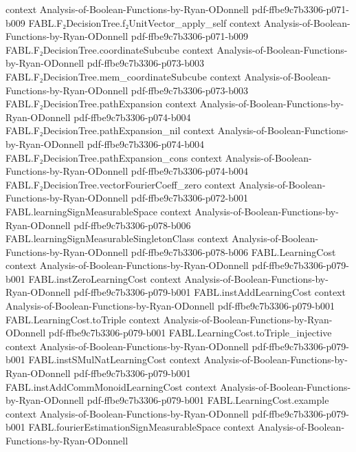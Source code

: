 \begin{theorem}
  {context}
  {Analysis-of-Boolean-Functions-by-Ryan-ODonnell}
  {pdf-ffbe9c7b3306-p071-b009}
\proofstep
  {FABL.F₂DecisionTree.f₂UnitVector_apply_self}
  {context}
  {Analysis-of-Boolean-Functions-by-Ryan-ODonnell}
  {pdf-ffbe9c7b3306-p071-b009}
\proofstep
  {FABL.F₂DecisionTree.coordinateSubcube}
  {context}
  {Analysis-of-Boolean-Functions-by-Ryan-ODonnell}
  {pdf-ffbe9c7b3306-p073-b003}
\proofstep
  {FABL.F₂DecisionTree.mem_coordinateSubcube}
  {context}
  {Analysis-of-Boolean-Functions-by-Ryan-ODonnell}
  {pdf-ffbe9c7b3306-p073-b003}
\proofstep
  {FABL.F₂DecisionTree.pathExpansion}
  {context}
  {Analysis-of-Boolean-Functions-by-Ryan-ODonnell}
  {pdf-ffbe9c7b3306-p074-b004}
\proofstep
  {FABL.F₂DecisionTree.pathExpansion_nil}
  {context}
  {Analysis-of-Boolean-Functions-by-Ryan-ODonnell}
  {pdf-ffbe9c7b3306-p074-b004}
\proofstep
  {FABL.F₂DecisionTree.pathExpansion_cons}
  {context}
  {Analysis-of-Boolean-Functions-by-Ryan-ODonnell}
  {pdf-ffbe9c7b3306-p074-b004}
\proofstep
  {FABL.F₂DecisionTree.vectorFourierCoeff_zero}
  {context}
  {Analysis-of-Boolean-Functions-by-Ryan-ODonnell}
  {pdf-ffbe9c7b3306-p072-b001}
\proofstep
  {FABL.learningSignMeasurableSpace}
  {context}
  {Analysis-of-Boolean-Functions-by-Ryan-ODonnell}
  {pdf-ffbe9c7b3306-p078-b006}
\proofstep
  {FABL.learningSignMeasurableSingletonClass}
  {context}
  {Analysis-of-Boolean-Functions-by-Ryan-ODonnell}
  {pdf-ffbe9c7b3306-p078-b006}
\proofstep
  {FABL.LearningCost}
  {context}
  {Analysis-of-Boolean-Functions-by-Ryan-ODonnell}
  {pdf-ffbe9c7b3306-p079-b001}
\proofstep
  {FABL.instZeroLearningCost}
  {context}
  {Analysis-of-Boolean-Functions-by-Ryan-ODonnell}
  {pdf-ffbe9c7b3306-p079-b001}
\proofstep
  {FABL.instAddLearningCost}
  {context}
  {Analysis-of-Boolean-Functions-by-Ryan-ODonnell}
  {pdf-ffbe9c7b3306-p079-b001}
\proofstep
  {FABL.LearningCost.toTriple}
  {context}
  {Analysis-of-Boolean-Functions-by-Ryan-ODonnell}
  {pdf-ffbe9c7b3306-p079-b001}
\proofstep
  {FABL.LearningCost.toTriple_injective}
  {context}
  {Analysis-of-Boolean-Functions-by-Ryan-ODonnell}
  {pdf-ffbe9c7b3306-p079-b001}
\proofstep
  {FABL.instSMulNatLearningCost}
  {context}
  {Analysis-of-Boolean-Functions-by-Ryan-ODonnell}
  {pdf-ffbe9c7b3306-p079-b001}
\proofstep
  {FABL.instAddCommMonoidLearningCost}
  {context}
  {Analysis-of-Boolean-Functions-by-Ryan-ODonnell}
  {pdf-ffbe9c7b3306-p079-b001}
\proofstep
  {FABL.LearningCost.example}
  {context}
  {Analysis-of-Boolean-Functions-by-Ryan-ODonnell}
  {pdf-ffbe9c7b3306-p079-b001}
\proofstep
  {FABL.fourierEstimationSignMeasurableSpace}
  {context}
  {Analysis-of-Boolean-Functions-by-Ryan-ODonnell}

\end{theorem}

